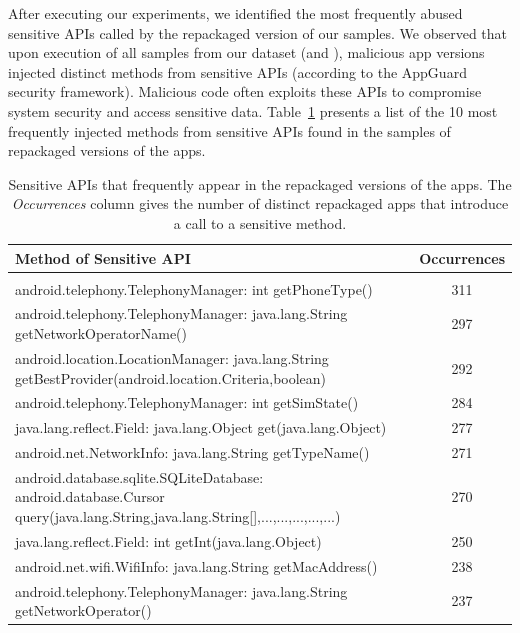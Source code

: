 After executing our experiments, we identified the  most frequently abused sensitive APIs called by the repackaged version of our samples.
We observed that upon execution of all samples from our dataset (\sds and \cds), malicious app versions injected  distinct methods from sensitive APIs (according to the
AppGuard~\cite{DBLP:conf/esorics/BackesGHMS13} security framework).
Malicious code often exploits these APIs to compromise system security and access sensitive data. Table~\ref{tab:APIused}
presents a list of the 10 most frequently injected methods from sensitive APIs found in the
\cds samples of repackaged versions of the apps.



\begin{table}
\caption{Sensitive APIs that frequently appear in the repackaged versions of the apps. The
    \emph{Occurrences} column gives the number of distinct repackaged apps that introduce a call
  to a sensitive method.}\label{tab:APIused}
\begin{tabular*}{\textheight}{@{\extracolsep\fill}lc}

 \hline
    Method of Sensitive API & Occurrences \\
    \hline \\
    android.telephony.TelephonyManager: int getPhoneType() &  311\\
    android.telephony.TelephonyManager: java.lang.String getNetworkOperatorName() &  297 \\
    android.location.LocationManager: java.lang.String getBestProvider(android.location.Criteria,boolean) &  292 \\
    android.telephony.TelephonyManager: int getSimState() &	284\\
 java.lang.reflect.Field: java.lang.Object get(java.lang.Object)&	277\\
    android.net.NetworkInfo: java.lang.String getTypeName() &  271\\
    android.database.sqlite.SQLiteDatabase: android.database.Cursor query(java.lang.String,java.lang.String[],...,...,...,...,...) &  270 \\
       java.lang.reflect.Field: int getInt(java.lang.Object) &  250\\
        android.net.wifi.WifiInfo: java.lang.String getMacAddress()	& 238\\
    
    android.telephony.TelephonyManager: java.lang.String getNetworkOperator() &  237\\

\hline

\end{tabular*}

\end{table}


